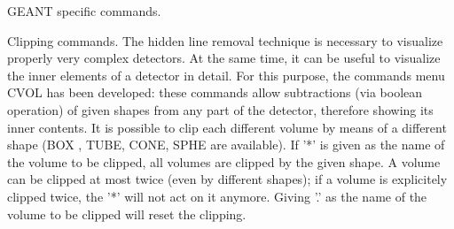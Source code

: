 \newcommand{\BEGOPT}[1]{%
\par\noindent Possible {\tt #1} values are:
\par\noindent \begin{tabular}{lp{.85\textwidth}}}
\newcommand{\DEFOPT}[2]{%
{\tt #1} & #2 \\[1ex]}
\newcommand{\ENDOPT}{\end{tabular}\par}

\newcommand{\BEGTEXT}{\par}
\newcommand{\ENDTEXT}{}
\newcommand{\ENDVERB}{\par}
\newcommand{\EMPTY}{{\tt '\char`\ '}}%
\newcommand{\BRA}{$\langle$}%
\newcommand{\KET}{$\rangle$}%
\newcommand{\PIPE}{$|$}%
\newcommand{\DQUOTE}{{\tt "}}%

%
\ifMENUtext
   \par
GEANT specific commands.  


\fi
{}
\ifMENUtext
   \par
Clipping commands.  The hidden line removal technique is necessary to 
   visualize properly very complex detectors. At the same time, it can be 
   useful to visualize the inner elements of a detector in detail. For this 
   purpose, the commands menu CVOL has been developed: these commands allow 
   subtractions (via boolean operation) of given shapes from any part of the 
   detector, therefore showing its inner contents. It is possible to clip each 
   different volume by means of a different shape (BOX , TUBE, CONE, SPHE are 
   available). If '*' is given as the name of the volume to be clipped, all 
   volumes are clipped by the given shape.  A volume can be clipped at most 
   twice (even by different shapes); if a volume is explicitely clipped twice, 
   the '*' will not act on it anymore. Giving '.' as the name of the volume to 
   be clipped will reset the clipping.  


\fi


\BEGARG
{}
\ENDARG

